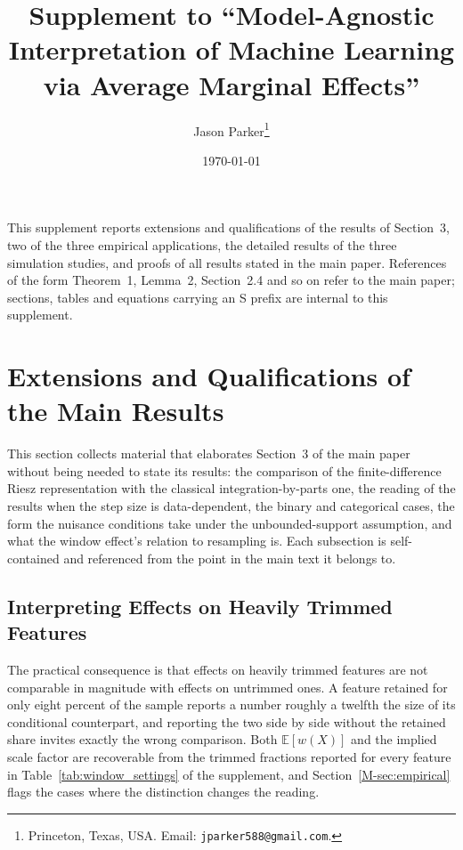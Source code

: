 \documentclass[12pt,a4paper]{article}
\numberwithin{equation}{section}
\theoremstyle{plain}
\theoremstyle{definition}
\newcommand{\E}{\mathbb{E}}
\begin{document}
\title{Supplement to ``Model-Agnostic Interpretation of Machine
Learning via Average Marginal Effects''}
\author{Jason Parker\thanks{Princeton, Texas, USA. Email:
\texttt{jparker588@gmail.com}.}}
\date{\today}
\maketitle

This supplement reports extensions and qualifications of the results of
Section~3, two of the three empirical applications, the detailed results
of the three simulation studies, and proofs of all results stated in the
main paper. References of the form Theorem~1,
Lemma~2, Section~2.4 and so on refer to the main paper; sections,
tables and equations carrying an \textsf{S} prefix are internal to this
supplement.

	\section{Extensions and Qualifications of the Main Results}
	\label{sec:extras}

	This section collects material that elaborates Section~3 of the main paper
	without being needed to state its results: the comparison of the
	finite-difference Riesz representation with the classical
	integration-by-parts one, the reading of the results when the step size is
	data-dependent, the binary and categorical cases, the form the nuisance
	conditions take under the unbounded-support assumption, and what the window
	effect's relation to resampling is. Each subsection is self-contained and
	referenced from the point in the main text it belongs to.

	\subsection{Interpreting Effects on Heavily Trimmed Features}

	The practical consequence is that effects on heavily trimmed features are
	not comparable in magnitude with effects on untrimmed ones. A feature
	retained for only eight percent of the sample reports a number roughly a
	twelfth the size of its conditional counterpart, and reporting the two side
	by side without the retained share invites exactly the wrong comparison.
	Both $\E[w(X)]$ and the implied scale factor are recoverable from the
	trimmed fractions reported for every feature in
	Table~\ref{tab:window_settings} of the supplement, and
	Section~\ref{M-sec:empirical} flags the cases where the distinction changes
	the reading.
\end{document}
